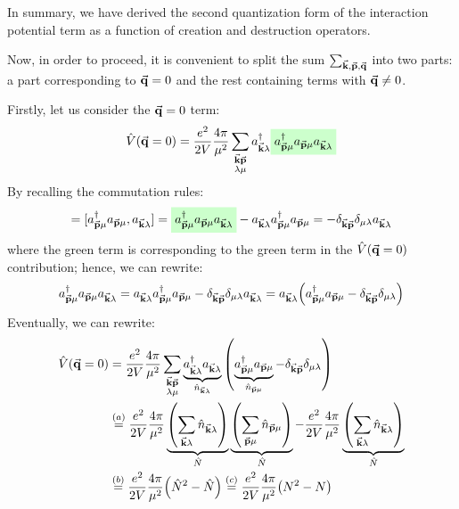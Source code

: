 \documentclass[../main/main.tex]{subfiles}
\begin{document}

In summary, we have derived the second quantization form of the interaction potential term as a function of creation and destruction operators.

Now, in order to proceed, it is convenient to split the sum \( \sum_{\va{k},\va{p},\va{q}}^{}   \) into two parts: a part corresponding to \( \va{q}=0 \) and the rest containing terms with \( \va{q}\neq0 \).

Firstly, let us consider the \( \va{q}=0 \) term: 
\begin{equation*}
  \hat{V} (\va{q}=0) = \frac{e^2}{2V} \frac{4 \pi }{\mu ^2} \sum_{\substack{\va{k} \va{p}\\ \lambda \mu  } }^{}  a_{\va{k} \lambda } ^\dag \mathcolorbox{green!20}{a_{\va{p} \mu } ^\dag a_{\va{p} \mu } a_{\va{k} \lambda }}
\end{equation*}
By recalling the commutation rules:
\begin{equation*}
[\hat{n}_{\va{p} \mu }, a_{\va{k} \lambda } ] =
[a_{\va{p} \mu } ^\dag a_{\va{p} \mu }, a_{\va{k} \lambda } ]
= \mathcolorbox{green!20}{a_{\va{p} \mu }^\dag a_{\va{p} \mu } a_{\va{k}\lambda }} - a_{\va{k} \lambda } a_{\va{p} \mu }^\dag a_{\va{p} \mu }
= - \delta _{\va{k} \va{p}} \delta _{\mu \lambda } a_{\va{k} \lambda }
\end{equation*}
where the green term is corresponding to the green term in the \( \hat{V} (\va{q}=0)  \) contribution; hence, we can rewrite:
\begin{equation*}
 a_{\va{p} \mu } ^\dag a_{\va{p} \mu } a_{\va{k} \lambda }
 = a_{\va{k} \lambda } a_{\va{p} \mu } ^\dag a_{\va{p} \mu }
 - \delta _{\va{k} \va{p}} \delta _{\mu \lambda } a_{\va{k} \lambda }
 = a_{\va{k}\lambda } \qty(  a_{\va{p} \mu } ^\dag a_{\va{p} \mu } - \delta _{\va{k} \va{p}} \delta _{\mu \lambda } )
\end{equation*}
Eventually, we can rewrite:
\begin{equation*}
\begin{split}
  \hat{V} \qty(\va{q} = 0) &= \frac{e^2}{2V}  \frac{4 \pi }{\mu ^2}
  \sum_{\substack{\va{k} \va{p}\\ \lambda  \mu  } }^{}
  \underbrace{a_{\va{k} \lambda } ^\dag a_{\va{k} \lambda }}_{\hat{n}_{\va{k}\lambda } }
  \qty( \underbrace{a_{\va{p} \mu }^\dag a_{\va{p} \mu } }_{\hat{n}_{\va{p} \mu } } - \delta _{\va{k} \va{p}} \delta _{\mu \lambda }  )   \\
  & \overset{(a)}{=}  \frac{e^2}{2V}  \frac{4 \pi }{\mu ^2} \underbrace{ \qty(\sum_{\va{k}\lambda }^{} \hat{n}_{\va{k} \lambda }   )  }_{\hat{N} }
  \underbrace{\qty(\sum_{\va{p} \mu }^{} \hat{n}_{\va{p} \mu }   ) }_{\hat{N} }
  -  \frac{e^2}{2V}  \frac{4 \pi }{\mu ^2} \underbrace{ \qty( \sum_{\va{k} \lambda }^{} \hat{n}_{\va{k} \lambda }    )  }_{\hat{N} } \\
  & \overset{(b)}{=}  \frac{e^2}{2V}  \frac{4 \pi }{\mu ^2} \qty(\hat{N}^2 - \hat{N}  )
  \overset{(c)}{=} \frac{e^2}{2V}  \frac{4 \pi }{\mu ^2} \qty(N^2 - N)
\end{split}
\end{equation*}
\end{document}
